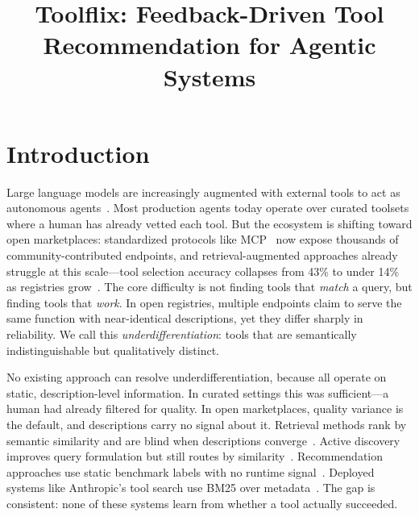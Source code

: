 \documentclass{article}
\title{Toolflix: Feedback-Driven Tool Recommendation for Agentic Systems}
\author{%
}
\begin{document}
\maketitle

\begin{abstract}
\end{abstract}


\section{Introduction}
\label{sec:intro}

Large language models are increasingly augmented with external tools to act as autonomous agents~\citep{schick2024toolformer, yao2023react, shen2024hugginggpt}. Most production agents today operate over curated toolsets where a human has already vetted each tool. But the ecosystem is shifting toward open marketplaces: standardized protocols like MCP~\citep{anthropic2025mcp} now expose thousands of community-contributed endpoints, and retrieval-augmented approaches already struggle at this scale---tool selection accuracy collapses from 43\% to under 14\% as registries grow~\citep{sun2025ragmcp}. The core difficulty is not finding tools that \emph{match} a query, but finding tools that \emph{work}. In open registries, multiple endpoints claim to serve the same function with near-identical descriptions, yet they differ sharply in reliability. We call this \emph{underdifferentiation}: tools that are semantically indistinguishable but qualitatively distinct.

No existing approach can resolve underdifferentiation, because all operate on static, description-level information. In curated settings this was sufficient---a human had already filtered for quality. In open marketplaces, quality variance is the default, and descriptions carry no signal about it. Retrieval methods rank by semantic similarity and are blind when descriptions converge~\citep{shi2024toolret}. Active discovery improves query formulation but still routes by similarity~\citep{fei2025mcpzero}. Recommendation approaches use static benchmark labels with no runtime signal~\citep{shi2026agentselect}. Deployed systems like Anthropic's tool search use BM25 over metadata~\citep{anthropic2025toolsearch}. The gap is consistent: none of these systems learn from whether a tool actually succeeded.
\end{document}
